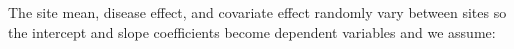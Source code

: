  The site mean, disease effect, and covariate effect randomly vary between sites so the intercept and slope coefficients become dependent variables \cite{Raudenbush2000} and we assume: